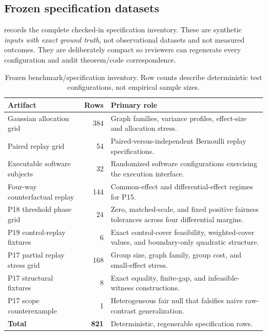 \subsection{Frozen specification datasets}

 records the complete checked-in specification
inventory. These are synthetic \emph{inputs with exact ground truth}, not
observational datasets and not measured outcomes. They are deliberately compact
so reviewers can regenerate every configuration and audit theorem/code
correspondence.

\begin{table}[H]
\centering
\caption{Frozen benchmark/specification inventory. Row counts describe
deterministic test configurations, not empirical sample sizes.}
\label{arch:tab:benchmark-inventory}
\normalsize
\begin{tabular}{@{}p{}r p{}@{}}
\toprule
Artifact & Rows & Primary role \\
\midrule
Gaussian allocation grid & 384 & Graph families, variance profiles, effect-size and allocation stress. \\
Paired replay grid & 54 & Paired-versus-independent Bernoulli replay specifications. \\
Executable software subjects & 32 & Randomized software configurations exercising the execution interface. \\
Four-way counterfactual replay & 144 & Common-effect and differential-effect regimes for P15. \\
P18 threshold phase grid & 24 & Zero, matched-scale, and fixed positive fairness tolerances across four differential margins. \\
P19 control-replay fixtures & 6 & Exact control-cover feasibility, weighted-cover values, and boundary-only quadratic structure. \\
P17 partial replay stress grid & 168 & Group size, graph family, group cost, and small-effect stress. \\
P17 structural fixtures & 8 & Exact equality, finite-gap, and infeasible-witness constructions. \\
P17 scope counterexample & 1 & Heterogeneous fair null that falsifies naive raw-contrast generalization. \\
\midrule
\textbf{Total} & \textbf{821} & Deterministic, regenerable specification rows. \\
\bottomrule
\end{tabular}
\end{table}

